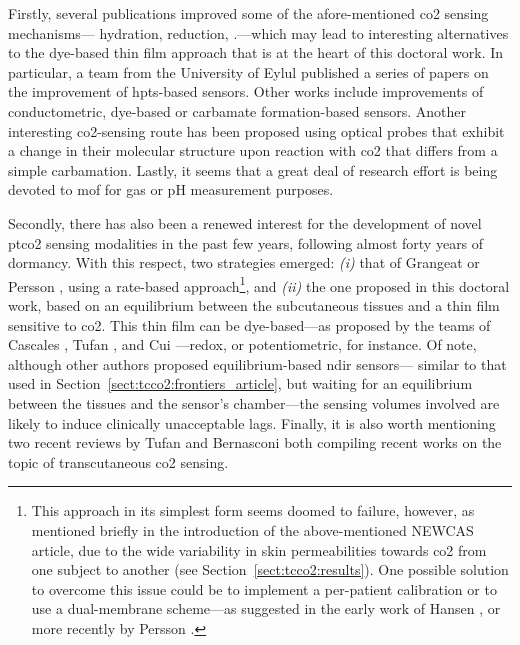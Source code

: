 Firstly, several publications improved some of the afore-mentioned \gls{co2} sensing mechanisms---\ie{} hydration, reduction, \etc.---which may lead to interesting alternatives to the dye-based thin film approach that is at the heart of this doctoral work. In particular, a team from the University of Eylul published a series of papers on the improvement of \gls{hpts}-based sensors\cite{ongun2021, ongun2023a, oguzlar2023b, yilmaz2024}. Other works include improvements of conductometric\cite{kotbi2022, rath2024}, dye-based\cite{shahid2022, zhang2023atu} or carbamate formation-based\cite{lee2022tur, choi2024} sensors. Another interesting \gls{co2}-sensing route has been proposed using optical probes that exhibit a change in their molecular structure upon reaction with \gls{co2} that differs from a simple carbamation\cite{green2022, zhu2024}. Lastly, it seems that a great deal of research effort is being devoted to \gls{mof} for gas or pH measurement purposes\cite{zhang2023lum, mohammedameen2024}.

Secondly, there has also been a renewed interest for the development of novel \gls{ptco2} sensing modalities in the past few years, following almost forty years of dormancy. With this respect, two strategies emerged: \textit{(i)} that of Grangeat \etal{}\cite{grangeat2023} or Persson \etal{}\cite{persson2023}, using a rate-based approach\footnote{This approach in its simplest form seems doomed to failure, however, as mentioned briefly in the introduction of the above-mentioned NEWCAS article\cite{dervieux2024newcas}, due to the wide variability in skin permeabilities towards \gls{co2} from one subject to another (see Section~\ref{sect:tcco2:results}). One possible solution to overcome this issue could be to implement a per-patient calibration or to use a dual-membrane scheme---as suggested in the early work of Hansen \etal{}\cite{hansen1980}, or more recently by Persson \etal{}\cite{persson2023}.}, and \textit{(ii)} the one proposed in this doctoral work, based on an equilibrium between the subcutaneous tissues and a thin film sensitive to \gls{co2}. This thin film can be dye-based---as proposed by the teams of Cascales \etal{}\cite{cascales2022, cascales2023}, Tufan \etal{}\cite{tufan2022, tufan2023a, tufan2023c}, and Cui \etal{}\cite{cui2024}---redox\cite{ahuja2023}, or potentiometric\cite{jia2024}, for instance. Of note, although other authors proposed equilibrium-based \gls{ndir} sensors---\ie{} similar to that used in Section~\ref{sect:tcco2:frontiers_article}, but waiting for an equilibrium between the tissues and the sensor's chamber---the sensing volumes involved are likely to induce clinically unacceptable lags\cite{li2023non, angelucci2024, elsafoury2024}. Finally, it is also worth mentioning two recent reviews by Tufan \etal{}\cite{tufan2023b} and Bernasconi \etal{}\cite{bernasconi2024} both compiling recent works on the topic of transcutaneous \gls{co2} sensing.

